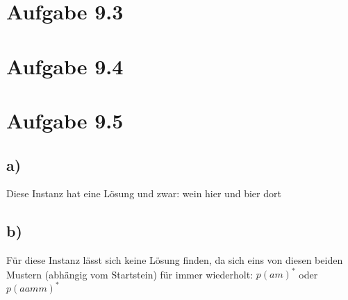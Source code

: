 \documentclass{article}
\begin{document}
\section*{Aufgabe 9.3}

\section*{Aufgabe 9.4}

\section*{Aufgabe 9.5}
\subsection*{a)}
Diese Instanz hat eine Lösung und zwar: wein hier und bier dort
\subsection*{b)}
Für diese Instanz lässt sich keine Lösung finden, da sich eins von diesen beiden Mustern (abhängig vom Startstein) für immer wiederholt: $p(am)^*$ oder $p(aamm)^*$
\end{document}
